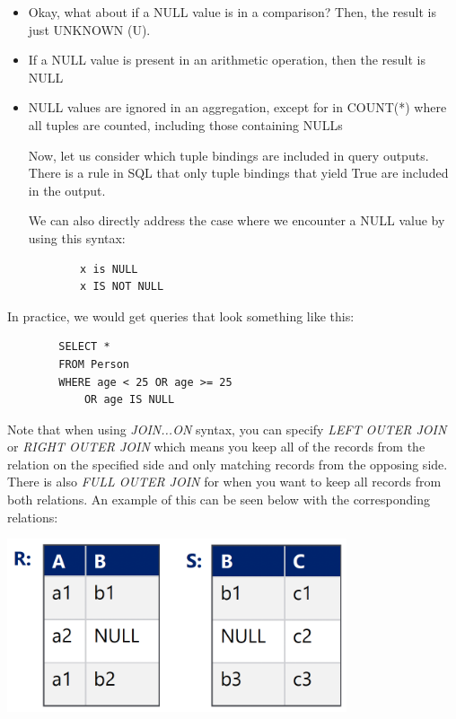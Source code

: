 \documentclass{article}
\begin{document}
\begin{itemize}
    \item Okay, what about if a NULL value is in a comparison? Then, the result is just UNKNOWN (U).
    \item If a NULL value is present in an arithmetic operation, then the result is NULL
    \item NULL values are ignored in an aggregation, except for in COUNT(*) where all tuples are counted, including those containing NULLs

Now, let us consider which tuple bindings are included in query outputs. There is a rule in SQL that only tuple bindings that yield True are included in the output.

We can also directly address the case where we encounter a NULL value by using this syntax:

\begin{tcolorbox}
    \begin{verbatim}
        x is NULL
        x IS NOT NULL
    \end{verbatim}
\end{tcolorbox}
\end{itemize}

In practice, we would get queries that look something like this:
\begin{tcolorbox}
    \begin{verbatim}
        SELECT *
        FROM Person
        WHERE age < 25 OR age >= 25
            OR age IS NULL
    \end{verbatim}
\end{tcolorbox}

Note that when using \textit{JOIN...ON} syntax, you can specify \textit{LEFT OUTER JOIN} or \textit{RIGHT OUTER JOIN} which means you keep all of the records from the relation on the specified side and only matching records from the opposing side. There is also \textit{FULL OUTER JOIN} for when you want to keep all records from both relations. An example of this can be seen below with the corresponding relations:

\includegraphics[width=10cm]{Assets/nullJoins.png}
\end{document}
